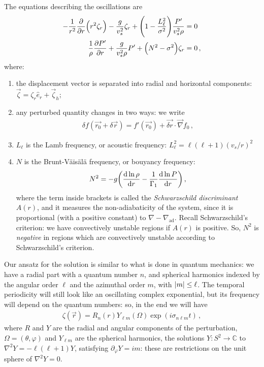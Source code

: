 \documentclass[main.tex]{subfiles}
\begin{document}
The equations describing the oscillations are 
%
\begin{subequations}
\begin{align}
- \frac{1}{r^2} \pdv{}{r} \qty(r^2 \zeta_{r}) - \frac{g}{v_s^2} \zeta_{r} + \qty(1 - \frac{L_\ell^2}{\sigma^2}) \frac{P'}{v_s^2 \rho } &= 0  \\
\frac{1}{\rho } \pdv{P'}{r} + \frac{g}{v_s^2\rho } P' + \qty(N^2-\sigma^2)\zeta_{r} &=0
\,,
\end{align}
\end{subequations}
%
where: 
\begin{enumerate}
  \item the displacement vector is separated into radial and horizontal components: \(\vec{\zeta} = \zeta_{r} \hat{e}_{r} + \vec{\zeta}_{h}\); 
  \item any perturbed quantity changes in two ways: we write 
  \begin{align}
  \delta f( \vec{r_0} + \delta \vec{r}) = f' (\vec{r_0} ) + \vec{ \delta  r} \cdot \vec{\nabla} f_0 
  \,,
  \end{align}
  \item \(L_{\ell}\) is the Lamb frequency, or acoustic frequency: \(L_{\ell}^2 = \ell (\ell+1) (v_s / r)^2\)
  \item \(N\) is the Brunt-Väisälä frequency, or bouyancy frequency: 
  \begin{align}
    N^2= -g \qty(\dv{\ln \rho }{r} - \frac{1}{\Gamma_1} \dv{\ln P }{r} )
  \,,
  \end{align}
  where the term inside brackets is called the \emph{Schwarzschild discriminant} \(A(r)\), and it measures the non-adiabaticity of the system, since it is proportional (with a positive constant) to \(\nabla - \nabla_{\text{ad}}\). 
  Recall Schwarzschild's criterion: we have convectively unstable regions if \(A(r)\) is positive. So, \(N^2\) is \emph{negative} in regions which are convectively unstable according to Schwarzschild's criterion.
\end{enumerate}

Our ansatz for the solution is similar to what is done in quantum mechanics: we have a radial part with a quantum number \(n\), and spherical harmonics indexed by the angular order \(\ell \) and the azimuthal order \(m\), with \(\abs{m} \leq \ell\). The temporal periodicity will still look like an oscillating complex exponential, but its frequency will depend on the quantum numbers: so, in the end we will have 
%
\begin{align}
\zeta (\vec{r}) = R_{n} (r) Y_{\ell m} (\Omega) \exp(i \sigma_{n \ell m} t)
\,,
\end{align}
%
where \(R\) and \(Y\) are the radial and angular components of the perturbation, \(\Omega = (\theta , \varphi )\) and \(Y_{\ell m}\) are the spherical harmonics, the solutions \(Y \colon S^{2} \rightarrow \mathbb{C}\) to \(\nabla^2 Y = - \ell (\ell +1) Y \), satisfying \(\partial_{\varphi }Y = im\): these are restrictions on the unit sphere of \(\nabla^2Y = 0\). 
\end{document}
